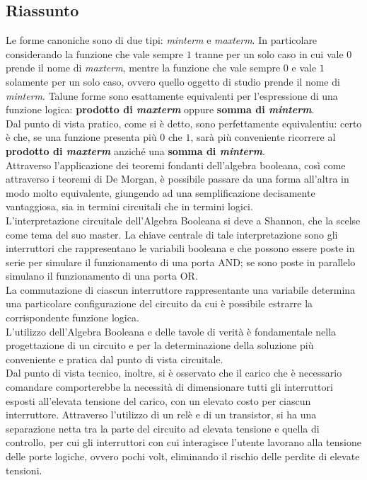 \documentclass[a4paper]{extarticle}
\begin{document}
\subsection{Riassunto}
Le forme canoniche sono di due tipi: \textit{minterm} e \textit{maxterm}. In particolare considerando la funzione che vale sempre \(1\) tranne per un solo caso in cui vale \(0\) prende il nome di \textit{maxterm}, mentre la funzione che vale sempre \(0\) e vale \(1\) solamente per un solo caso, ovvero quello oggetto di studio prende il nome di \textit{minterm}. Talune forme sono esattamente equivalenti per l'espressione di una funzione logica: \textbf{prodotto di \textit{maxterm}} oppure \textbf{somma di \textit{minterm}}.\\
Dal punto di vista pratico, come si è detto, sono perfettamente equivalentiu: certo è che, se una funzione presenta più \(0\) che \(1\), sarà più conveniente ricorrere al \textbf{prodotto di \textit{maxterm}} anziché una \textbf{somma di \textit{minterm}}.\\
Attraverso l'applicazione dei teoremi fondanti dell'algebra booleana, così come attraverso i teoremi di De Morgan, è possibile passare da una forma all'altra in modo molto equivalente, giungendo ad una semplificazione decisamente vantaggiosa, sia in termini circuitali che in termini logici.\\
L'interpretazione circuitale dell'Algebra Booleana si deve a Shannon, che la scelse come tema del suo master. La chiave centrale di tale interpretazione sono gli interruttori che rappresentano le variabili booleana e che possono essere poste in serie per simulare il funzionamento di una porta AND; se sono poste in parallelo simulano il funzionamento di una porta OR.\\
La commutazione di ciascun interruttore rappresentante una variabile determina una particolare configurazione del circuito da cui è possibile estrarre la corrispondente funzione logica.\\
L'utilizzo dell'Algebra Booleana e delle tavole di verità è fondamentale nella progettazione di un circuito e per la determinazione della soluzione più conveniente e pratica dal punto di vista circuitale.\\
Dal punto di vista tecnico, inoltre, si è osservato che il carico che è necessario comandare comporterebbe la necessità di dimensionare tutti gli interruttori esposti all'elevata tensione del carico, con un elevato costo per ciascun interruttore. Attraverso l'utilizzo di un relè e di un transistor, si ha una separazione netta tra la parte del circuito ad elevata tensione e quella di controllo, per cui gli interruttori con cui interagisce l'utente lavorano alla tensione delle porte logiche, ovvero pochi volt, eliminando il rischio delle perdite di elevate tensioni.\\
\end{document}
